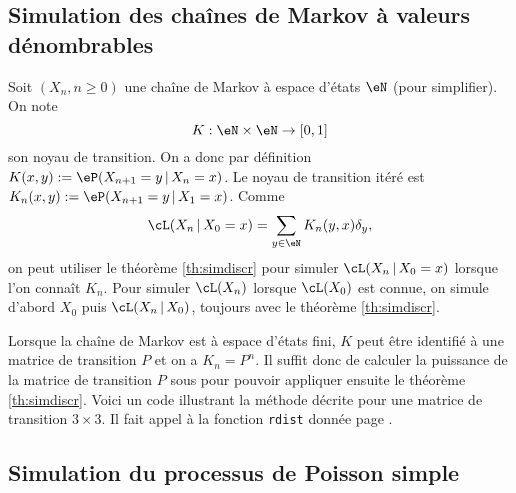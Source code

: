 %
%
%

\subsection{Simulation des chaînes de Markov à valeurs dénombrables}

Soit $(X_n,n\geq 0)$ une chaîne de Markov à espace d'états $\eN$ (pour
simplifier). On note
$$K:\eN\times\eN\to[0,1]$$
son noyau de transition. On a donc par définition
$K(x,y):=\eP(X_{n+1}=y\,|\,X_n=x)$. Le noyau de transition itéré est
$K_n(x,y):=\eP(X_{n+1}=y\,|\,X_1=x)$. Comme
$$\cL(X_n\,|\,X_0=x)=\sum_{y\in\eN}K_n(y,x)\delta_y,$$
on peut utiliser le théorème
\ref{th:simdiscr} pour simuler $\cL(X_n\,|\,X_0=x)$ lorsque l'on connaît
$K_n$. Pour simuler $\cL(X_n)$ lorsque $\cL(X_0)$ est connue, on simule
d'abord $X_0$ puis $\cL(X_n\,|\,X_0)$, toujours avec le théorème
\ref{th:simdiscr}.

Lorsque la chaîne de Markov est à espace d'états fini, $K$ peut être identifié
à une matrice de transition $P$ et on a $K_n=P^n$. Il suffit donc de calculer
la puissance de la matrice de transition $P$ sous \ML{} pour pouvoir appliquer
ensuite le théorème \ref{th:simdiscr}. Voici un code \ML{} illustrant la
méthode décrite pour une matrice de transition $3\times3$. Il fait appel à la
fonction \ML{} \texttt{rdist} donnée page \pageref{co:rdist}.
%

\subsection{Simulation du processus de Poisson simple}

